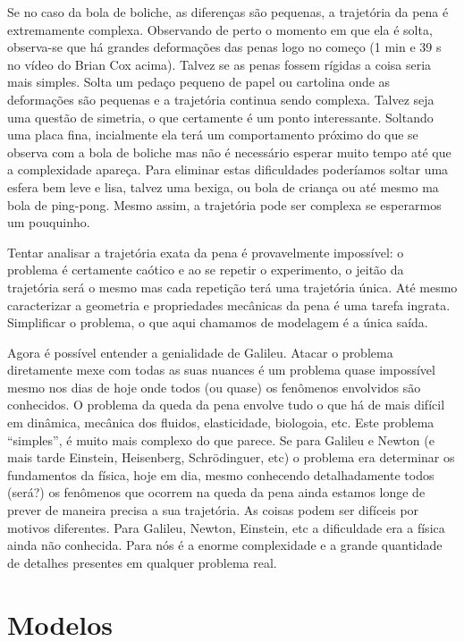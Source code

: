 Se no caso da bola de boliche, as diferenças são pequenas, a trajetória da pena é extremamente complexa. Observando de perto o momento em que ela é solta, observa-se que há grandes deformações das penas logo no começo (1 min e 39 s no vídeo do Brian Cox acima). Talvez se as penas fossem rígidas a coisa seria mais simples. Solta um pedaço pequeno de papel ou cartolina onde as deformações são pequenas e a trajetória continua sendo complexa. Talvez seja uma questão de simetria, o que certamente é um ponto interessante. Soltando uma placa fina, incialmente ela terá um comportamento próximo do que se observa com a bola de boliche mas não é necessário esperar muito tempo até que a complexidade apareça. Para eliminar estas dificuldades poderíamos soltar uma esfera bem leve e lisa, talvez uma bexiga, ou bola de criança ou até mesmo ma bola de ping-pong. Mesmo assim, a trajetória pode ser complexa se esperarmos um pouquinho.


Tentar analisar a trajetória exata da pena é provavelmente impossível: o problema é certamente caótico e ao se repetir o experimento, o jeitão da trajetória será o mesmo mas cada repetição terá uma trajetória única. Até mesmo caracterizar a geometria e propriedades mecânicas da pena é uma tarefa ingrata. Simplificar o problema, o que aqui chamamos de modelagem é a única saída.

Agora é possível entender a genialidade de Galileu. Atacar o problema diretamente mexe com todas as suas nuances  é um problema quase impossível mesmo nos dias de hoje onde todos (ou quase) os fenômenos envolvidos são conhecidos. O problema da queda da pena envolve tudo o que há de mais difícil  em dinâmica, mecânica dos fluidos, elasticidade, biologoia, etc. Este problema ``simples'', é muito mais complexo do que parece. Se para Galileu e Newton (e mais tarde Einstein, Heisenberg, Schrödinguer, etc) o problema era determinar os fundamentos da física, hoje em dia, mesmo conhecendo detalhadamente todos (será?) os fenômenos que ocorrem na queda da pena ainda estamos longe de prever de maneira precisa a sua trajetória. As coisas podem ser difíceis por motivos diferentes. Para Galileu, Newton, Einstein, etc a dificuldade era a física ainda não conhecida. Para nós é a enorme complexidade e a grande quantidade de detalhes presentes em qualquer problema real.

\section{Modelos}

